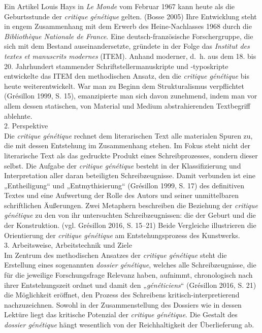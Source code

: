 \documentclass{article}
\begin{document}
        Ein Artikel Louis Hays in \emph{Le Monde} vom Februar 1967 kann heute als die Geburtsstunde der \emph{critique génétique} gelten. (Bosse 2005) Ihre Entwicklung steht in engem Zusammenhang mit dem Erwerb des Heine-Nachlasses 1968 durch die \emph{Bibliothèque Nationale de France}. Eine deutsch-französische Forschergruppe, die sich mit dem Bestand auseinandersetzte, gründete in der Folge das \emph{Institut des textes et manuscrits modernes }(ITEM). Anhand moderner, d. h. aus dem 18. bis 20. Jahrhundert stammender Schriftstellermanuskripte und -typoskripte entwickelte das ITEM den methodischen Ansatz, den die \emph{critique génétique} bis heute weiterentwickelt. War man zu Beginn dem Strukturalismus verpflichtet (Grésillon 1999, S. 15), emanzipierte man sich davon zunehmend, indem man vor allem dessen statischen, von Material und Medium abstrahierenden Textbegriff ablehnte.\\
            
        2. Perspektive\\
            
        Die \emph{critique génétique} rechnet dem literarischen Text alle materialen Spuren zu, die mit dessen Entstehung im Zusammenhang stehen. Im Fokus steht nicht der literarische Text als das gedruckte Produkt eines Schreibprozesses, sondern dieser selbst. Die Aufgabe der \emph{critique génétique} besteht in der Klassifizierung und Interpretation aller daran beteiligten Schreibzeugnisse. Damit verbunden ist eine „Entheiligung“ und „Entmythisierung“ (Grésillon 1999, S. 17) des definitiven Textes und eine Aufwertung der Rolle des Autors und seiner unmittelbaren schriftlichen Äußerungen. Zwei Metaphern beschreiben die Beziehung der \emph{critique génétique} zu den von ihr untersuchten Schreibzeugnissen: die der Geburt und die der Konstruktion. (vgl. Grésillon 2016, S. 15–21) Beide Vergleiche illustrieren die Orientierung der \emph{critique génétique} am Entstehungsprozess des Kunstwerks.\\
            
        3. Arbeitsweise, Arbeitstechnik und Ziele\\
            
        Im Zentrum des methodischen Ansatzes der \emph{critique génétique} steht die Erstellung eines sogenannten \emph{dossier génétique}, welches alle Schreibzeugnisse, die für die jeweilige Forschungsfrage Relevanz haben, aufnimmt, chronologisch nach ihrer Entstehungszeit ordnet und damit den „\emph{généticiens}“ (Grésillon 2016, S. 21) die Möglichkeit eröffnet, den Prozess des Schreibens kritisch-interpretierend nachzuzeichnen. Sowohl in der Zusammenstellung des Dossiers wie in dessen Lektüre liegt das kritische Potenzial der \emph{critique génétique}. Die Gestalt des \emph{dossier génétique }hängt wesentlich von der Reichhaltigkeit der Überlieferung ab.\\
            
\end{document}
